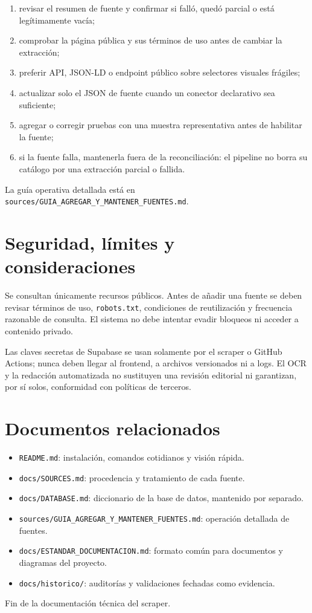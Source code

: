 \documentclass[11pt,a4paper]{article}
\begin{document}
\begin{enumerate}
  \item revisar el resumen de fuente y confirmar si fall\'{o}, qued\'{o} parcial o est\'{a} leg\'{i}timamente vac\'{i}a;
  \item comprobar la p\'{a}gina p\'{u}blica y sus t\'{e}rminos de uso antes de cambiar la extracci\'{o}n;
  \item preferir API, JSON-LD o endpoint p\'{u}blico sobre selectores visuales fr\'{a}giles;
  \item actualizar solo el JSON de fuente cuando un conector declarativo sea suficiente;
  \item agregar o corregir pruebas con una muestra representativa antes de habilitar la fuente;
  \item si la fuente falla, mantenerla fuera de la reconciliaci\'{o}n: el pipeline no borra su cat\'{a}logo por una extracci\'{o}n parcial o fallida.
\end{enumerate}

La gu\'{i}a operativa detallada est\'{a} en \texttt{sources/GUIA\_AGREGAR\_Y\_MANTENER\_FUENTES.md}.

\section{Seguridad, l\'{i}mites y consideraciones}

Se consultan \'{u}nicamente recursos p\'{u}blicos. Antes de a\~{n}adir una fuente se deben revisar t\'{e}rminos de uso, \texttt{robots.txt}, condiciones de reutilizaci\'{o}n y frecuencia razonable de consulta. El sistema no debe intentar evadir bloqueos ni acceder a contenido privado.

Las claves secretas de Supabase se usan solamente por el scraper o GitHub Actions; nunca deben llegar al frontend, a archivos versionados ni a logs. El OCR y la redacci\'{o}n automatizada no sustituyen una revisi\'{o}n editorial ni garantizan, por s\'{i} solos, conformidad con pol\'{i}ticas de terceros.

\section{Documentos relacionados}

\begin{itemize}
  \item \texttt{README.md}: instalaci\'{o}n, comandos cotidianos y visi\'{o}n r\'{a}pida.
  \item \texttt{docs/SOURCES.md}: procedencia y tratamiento de cada fuente.
  \item \texttt{docs/DATABASE.md}: diccionario de la base de datos, mantenido por separado.
  \item \texttt{sources/GUIA\_AGREGAR\_Y\_MANTENER\_FUENTES.md}: operaci\'{o}n detallada de fuentes.
  \item \texttt{docs/ESTANDAR\_DOCUMENTACION.md}: formato com\'{u}n para documentos y diagramas del proyecto.
  \item \texttt{docs/historico/}: auditor\'{i}as y validaciones fechadas como evidencia.
\end{itemize}

\vfill
\begin{center}
\color{gris}\small Fin de la documentaci\'{o}n t\'{e}cnica del scraper.
\end{center}
\end{document}
